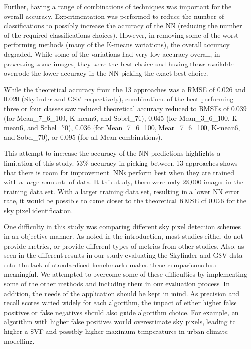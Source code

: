 \documentclass[final,3p,times,authoryear]{elsarticle}
\begin{document}
Further, having a range of combinations of techniques was important for the overall accuracy. Experimentation was performed to reduce the number of classifications to possibly increase the accuracy of the NN (reducing the number of the required classifications choices). However, in removing some of the worst performing methods (many of the K-means variations), the overall accuracy degraded. While some of the variations had very low accuracy overall, in processing some images, they were the best choice and having those available overrode the lower accuracy in the NN picking the exact best choice.

While the theoretical accuracy from the 13 approaches was a RMSE of 0.026 and 0.020 (Skyfinder and GSV respectively), combinations of the best performing three or four classes saw reduced theoretical accuracy reduced to RMSEs of 0.039 (for Mean\_7\_6\_100, K-mean6, and Sobel\_70), 0.045 (for Mean\_3\_6\_100, K-mean6, and Sobel\_70), 0.036 (for Mean\_7\_6\_100, Mean\_7\_6\_100, K-mean6, and Sobel\_70), or 0.095 (for all Mean combinations). 

This attempt to increase the accuracy of the NN predictions highlights a limitation of this study. 53\% accuracy in picking between 13 approaches shows that there is room for improvement. NNs perform best when they are trained with a large amounts of data. It this study, there were only 28,000 images in the training data set. With a larger training data set, resulting in a lower NN error rate, it would be possible to come closer to the theoretical RMSE of 0.026 for the sky pixel identification.

One difficulty in this study was comparing different sky pixel detection schemes in an objective manner. As noted in the introduction, most studies either do not provide metrics, or provide different types of metrics from other studies. Also, as seen in the different results in our study evaluating the Skyfinder and GSV data sets, the lack of standardised benchmarks makes these comparisons less meaningful. We attempted to overcome some of these difficulties by implementing some of the other methods and including them in our evaluation process. In addition, the needs of the application should be kept in mind. As precision and recall scores varied widely for each algorithm, the impact of either higher false positives or false negatives should also guide algorithm choice. For example, an algorithm with higher false positives would overestimate sky pixels, leading to higher a SVF and possibly higher maximum temperatures in urban climate modelling. 
\end{document}
